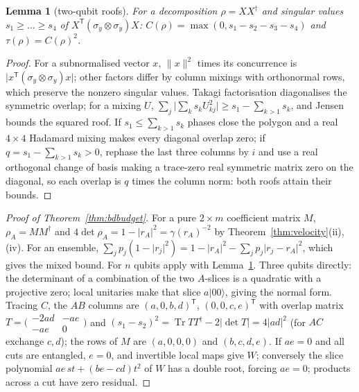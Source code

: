 \documentclass[aps,pra,onecolumn,superscriptaddress,nofootinbib,10pt]{revtex4-2}
\newtheorem{lemma}[theorem]{Lemma}
\theoremstyle{definition}
\theoremstyle{remark}
\newcommand{\tr}{\operatorname{Tr}}
\begin{document}
\begin{lemma}[two-qubit roofs]\label{lem:bdroof}
For a decomposition $\rho=XX^\dagger$ and singular values $s_1\ge\dots\ge s_4$ of $X^{\mathsf T}(\sigma_y\otimes\sigma_y)X$: $C(\rho)=\max(0,s_1-s_2-s_3-s_4)$ and $\tau(\rho)=C(\rho)^2$.
\end{lemma}
\begin{proof}
For a subnormalised vector $x$, $\lVert x\rVert^2$ times its concurrence is $\lvert x^{\mathsf T}(\sigma_y\otimes\sigma_y)x\rvert$; other factors differ by column mixings with
orthonormal rows, which preserve the nonzero singular values.  Takagi factorisation diagonalises the
symmetric overlap; for a mixing $U$, $\sum_j\lvert\sum_ks_kU_{kj}^2\rvert\ge s_1-\sum_{k>1}s_k$, and Jensen bounds the squared roof.  If $s_1\le\sum_{k>1}s_k$ phases
close the polygon and a real $4\times4$ Hadamard mixing makes every diagonal overlap zero; if $q=s_1-\sum_{k>1}s_k>0$,
rephase the last three columns by $i$ and use a real orthogonal change of basis making a trace-zero real
symmetric matrix zero on the diagonal, so each overlap is $q$ times the column norm: both roofs attain
their bounds.
\end{proof}
\begin{proof}[Proof of Theorem~\ref{thm:bdbudget}]
For a pure $2\times m$ coefficient matrix $M$, $\rho_A=MM^\dagger$ and $4\det\rho_A=1-\lvert r_A\rvert^2=\gamma(r_A)^{-2}$ by Theorem~\ref{thm:velocity}(ii), (iv).  For an ensemble,
$\sum_jp_j(1-\lvert r_j\rvert^2)=1-\lvert r_A\rvert^2-\sum_jp_j\lvert r_j-r_A\rvert^2$, which gives the mixed bound.  For $n$ qubits apply \cite[Eq.~(1)]{n4:OV} with
Lemma~\ref{lem:bdroof}.  Three qubits directly: the determinant of a combination of the two $A$-slices is a quadratic
with a projective zero; local unitaries make that slice $a\lvert00\rangle$, giving the normal form.  Tracing $C$, the $AB$ columns
are $(a,0,b,d)^{\mathsf T}$, $(0,0,c,e)^{\mathsf T}$ with overlap matrix $T=\bigl(\begin{smallmatrix}-2ad&-ae\\-ae&0\end{smallmatrix}\bigr)$ and $(s_1-s_2)^2=\tr TT^\dagger-2\lvert\det T\rvert=4\lvert ad\rvert^2$ (for $AC$ exchange $c,d$);
the rows of $M$ are $(a,0,0,0)$ and $(b,c,d,e)$.  If $ae=0$ and all cuts are entangled, $e=0$, and invertible local maps give $W$;
conversely the slice polynomial $ae\,st+(be-cd)t^2$ of $W$ has a double root, forcing $ae=0$; products across a cut
have zero residual.
\end{proof}
\end{document}
